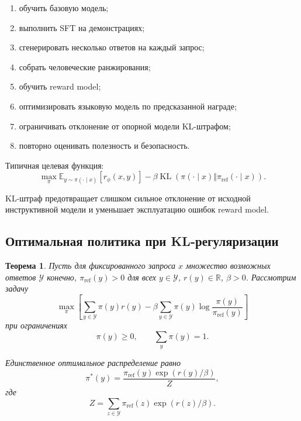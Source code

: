 \documentclass[12pt,a4paper]{article}
\DeclareMathOperator{\KL}{KL}
\newcommand{\R}{\mathbb{R}}
\newcommand{\E}{\mathbb{E}}
\newcommand{\1}{\mathbf{1}}
\newtheorem{theorem}{Теорема}[section]
\theoremstyle{definition}
\theoremstyle{remark}
\begin{document}
\begin{enumerate}
    \item обучить базовую модель;
    \item выполнить SFT на демонстрациях;
    \item сгенерировать несколько ответов на каждый запрос;
    \item собрать человеческие ранжирования;
    \item обучить reward model;
    \item оптимизировать языковую модель по предсказанной награде;
    \item ограничивать отклонение от опорной модели KL-штрафом;
    \item повторно оценивать полезность и безопасность.
\end{enumerate}

Типичная целевая функция:
\[
\max_\pi
\E_{y\sim\pi(\cdot\mid x)}
[r_\phi(x,y)]
-
\beta
\KL
\left(
\pi(\cdot\mid x)
\Vert
\pi_{\mathrm{ref}}(\cdot\mid x)
\right).
\]

KL-штраф предотвращает слишком сильное отклонение от исходной
инструктивной модели и уменьшает эксплуатацию ошибок reward model.

\subsection{Оптимальная политика при KL-регуляризации}

\begin{theorem}
Пусть для фиксированного запроса $x$ множество возможных ответов
$\mathcal{Y}$ конечно, $\pi_{\mathrm{ref}}(y)>0$ для всех
$y\in\mathcal{Y}$, $r(y)\in\R$, $\beta>0$. Рассмотрим задачу
\[
\max_{\pi}
\left[
\sum_{y\in\mathcal{Y}}\pi(y)r(y)
-
\beta
\sum_{y\in\mathcal{Y}}
\pi(y)\log\frac{\pi(y)}{\pi_{\mathrm{ref}}(y)}
\right]
\]
при ограничениях
\[
\pi(y)\geq0,\qquad
\sum_y\pi(y)=1.
\]

Единственное оптимальное распределение равно
\[
\pi^\ast(y)
=
\frac{
\pi_{\mathrm{ref}}(y)\exp(r(y)/\beta)
}{
Z
},
\]
где
\[
Z=
\sum_{z\in\mathcal{Y}}
\pi_{\mathrm{ref}}(z)\exp(r(z)/\beta).
\]
\end{theorem}
\end{document}
